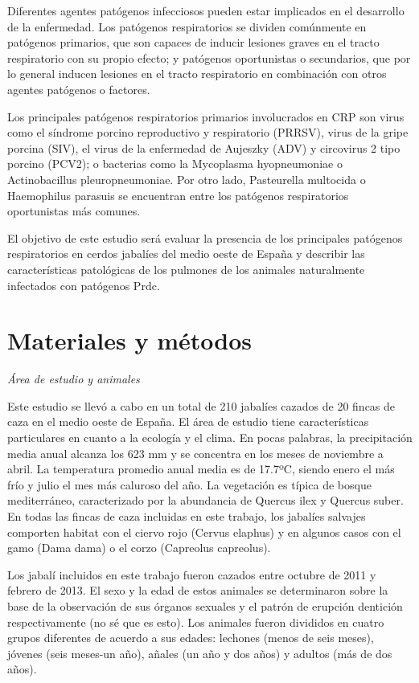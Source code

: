 \documentclass[12pt,a4paper,Spanish]{book}
\begin{document}
Diferentes agentes patógenos infecciosos pueden estar implicados en el desarrollo de la enfermedad. Los patógenos respiratorios se dividen comúnmente en patógenos primarios, que son capaces de inducir lesiones graves en el tracto respiratorio con su propio efecto; y patógenos oportunistas o secundarios, que por lo general inducen lesiones en el tracto respiratorio en combinación con otros agentes patógenos o factores.

Los principales patógenos respiratorios primarios involucrados en CRP son virus como el síndrome porcino reproductivo y respiratorio (PRRSV), virus de la gripe porcina (SIV), el virus de la enfermedad de Aujeszky (ADV) y circovirus 2 tipo porcino (PCV2); o bacterias como la Mycoplasma hyopneumoniae o Actinobacillus pleuropneumoniae. Por otro lado, Pasteurella multocida o Haemophilus parasuis se encuentran entre los patógenos respiratorios oportunistas más comunes.

El objetivo de este estudio será evaluar la presencia de los principales patógenos respiratorios en cerdos jabalíes del medio oeste de España y describir las características patológicas de los pulmones de los animales naturalmente infectados con patógenos Prdc.

\chapter{Materiales y métodos}

\textit{Área de estudio y animales}

Este estudio se llevó a cabo en un total de 210 jabalíes cazados de 20 fincas de caza en el medio oeste de España. El área de estudio tiene características particulares en cuanto a la ecología y el clima. En pocas palabras, la precipitación media anual alcanza los 623 mm y se concentra en los meses de noviembre a abril. La temperatura promedio anual media es de 17.7ºC, siendo enero el más frío y julio el mes más caluroso del año. La vegetación es típica de bosque mediterráneo, caracterizado por la abundancia de Quercus ilex y Quercus suber. En todas las fincas de caza incluidas en este trabajo, los jabalíes salvajes comporten habitat con el ciervo rojo (Cervus elaphus) y en algunos casos con el gamo (Dama dama) o el corzo (Capreolus capreolus).

Los jabalí incluidos en este trabajo fueron cazados entre octubre de 2011 y febrero de 2013. El sexo y la edad de estos animales se determinaron sobre la base de la observación de sus órganos sexuales y el patrón de erupción dentición respectivamente (no sé que es esto). Los animales fueron divididos en cuatro grupos diferentes de acuerdo a sus edades: lechones (menos de seis meses), jóvenes (seis meses-un año), añales (un año y dos años) y adultos (más de dos años).
\end{document}
